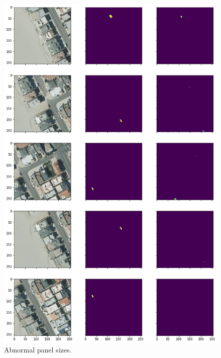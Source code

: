 \documentclass[a4paper, 12pt]{article}
\begin{document}
	\begin{figure}[H]
	    \centering
	    \includegraphics[height=0.92\textheight]{resources/png/bad_size.png}
	    \caption{Abnormal panel sizes.}
	\end{figure}
	
\end{document}

